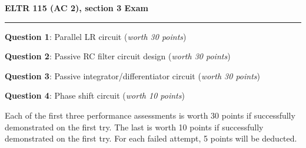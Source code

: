 
\centerline{\bf ELTR 115 (AC 2), section 3 Exam} \bigskip 
 
\vskip 10pt

\noindent
{}

\vskip 5pt

\hrule

\vskip 20pt

\noindent
{\bf Question 1}: Parallel LR circuit ({\it worth 30 points})

\vskip 10pt

\noindent
{\bf Question 2}: Passive RC filter circuit design ({\it worth 30 points})

\vskip 10pt

\noindent
{\bf Question 3}: Passive integrator/differentiator circuit ({\it worth 30 points})

\vskip 10pt

\noindent
{\bf Question 4}: Phase shift circuit ({\it worth 10 points})

\vskip 20pt

Each of the first three performance assessments is worth 30 points if successfully demonstrated on the first try.  The last is worth 10 points if successfully demonstrated on the first try.  For each failed attempt, 5 points will be deducted.



